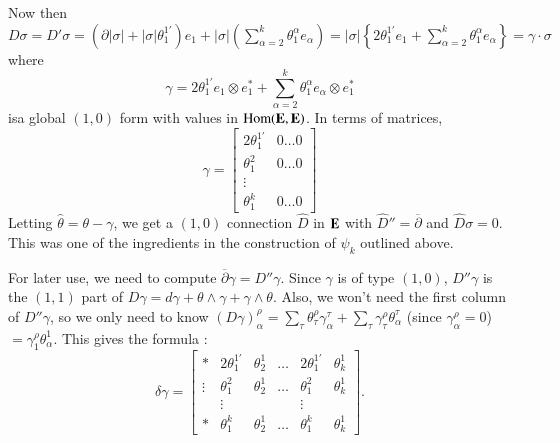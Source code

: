 Now then $D\sigma=D'\sigma=(\partial |\sigma|+|\sigma|\theta^{1'}_{1})e_{1}+|\sigma|\left(\sum\limits^{k}_{\alpha=2}\theta^{\alpha}_{1}e_{\alpha}\right)=|\sigma|\left\{2\theta^{1'}_{1}e_{1}+\sum\limits^{k}_{\alpha=2}\theta^{\alpha}_{1}e_{\alpha}\right\}=\gamma\cdot \sigma$ where
\begin{equation}
\gamma=2\theta^{1'}_{1}e_{1}\otimes e^{*}_{1}+\sum\limits^{k}_{\alpha=2}\theta^{\alpha}_{1}e_{\alpha}\otimes e^{*}_{1}\label{art08-sec8-eq8.15}
\end{equation}
is\pageoriginale a global $(1,0)$ form with values in $\operatorname{\mathrm{Hom}}(\mathbf{E},\mathbf{E})$. In terms of matrices,
\begin{equation}
\gamma=
\begin{bmatrix}
2\theta^{1'}_{1} & 0\ldots 0\\
\theta^{2}_{1} & 0\ldots 0\\
\vdots & \\
\theta^{k}_{1} & 0\ldots 0
\end{bmatrix}\label{art08-sec8-eq8.16}
\end{equation}
Letting $\widehat{\theta}=\theta-\gamma$, we get a $(1,0)$ connection $\widehat{D}$ in $\mathbf{E}$ with $\widehat{D}''=\overline{\partial}$ and $\widehat{D}\sigma=0$. This was one of the ingredients in the construction of $\psi_{k}$ outlined above.

For later use, we need to compute $\overline{\partial}\gamma=D''\gamma$. Since $\gamma$ is of type $(1,0)$, $D''\gamma$ is the $(1,1)$ part of $D\gamma=d\gamma+\theta\wedge\gamma+\gamma\wedge \theta$. Also, we won't need the first column of $D''\gamma$, so we only need to know $(D\gamma)^{\rho}_{\alpha}=\sum\limits_{\tau}\theta^{\rho}_{\tau}\gamma^{\tau}_{\alpha}+\sum\limits_{\tau}\gamma^{\rho}_{\tau}\theta^{\tau}_{\alpha}$ (since $\gamma^{\rho}_{\alpha}=0$) $=\gamma^{\rho}_{1}\theta^{1}_{\alpha}$. This gives the formula :
\begin{equation}
\delta\gamma =
\begin{bmatrix}
* & 2\theta^{1'}_{1} & \theta^{1}_{2} & \ldots & 2\theta^{1'}_{1} & \theta^{1}_{k}\\
\vdots & \theta^{2}_{1} & \theta^{1}_{2} & \ldots & \theta^{2}_{1} & \theta^{1}_{k}\\
 & \vdots & & & \vdots & \\
* & \theta^{k}_{1} & \theta^{1}_{2} & \ldots & \theta^{k}_{1} & \theta^{1}_{k}
\end{bmatrix}.
\label{art08-sec8-eq8.17}
\end{equation}

